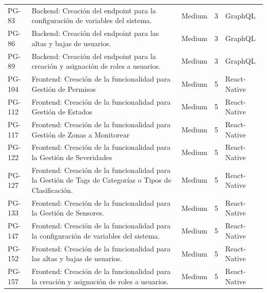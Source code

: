 \documentclass[11pt]{charter}
\begin{document}
\begin{tabularx}{\linewidth}{@{}p{1.3cm} p{14cm} p{1.7cm} p{1.5cm} p{2.5cm}@{}}
PG-83  & Backend: Creación del endpoint para la configuración de variables del sistema.                         & Medium    & 3                          & GraphQL               \\
PG-86  & Backend: Creación del endpoint para las altas y bajas de usuarios.                                     & Medium    & 3                          & GraphQL               \\
PG-89  & Backend: Creación del endpoint para la creación y asignación de roles a usuarios.                      & Medium    & 3                          & GraphQL               \\
PG-104 & Frontend: Creación de la funcionalidad para Gestión de Permisos                                        & Medium    & 5                          & React-Native          \\
PG-112 & Frontend: Creación de la funcionalidad para Gestión de Estados                                         & Medium    & 5                          & React-Native          \\
PG-117 & Frontend: Creación de la funcionalidad para Gestión de Zonas a Monitorear                              & Medium    & 5                          & React-Native          \\
PG-122 & Frontend: Creación de la funcionalidad para la Gestión de Severidades                                  & Medium    & 5                          & React-Native          \\
PG-127 & Frontend: Creación de la funcionalidad para la Gestión de Tags de Categorías o Tipos de Clasificación. & Medium    & 5                          & React-Native          \\
PG-133 & Frontend: Creación de la funcionalidad para la Gestión de Sensores.                                    & Medium    & 5                          & React-Native          \\
PG-147 & Frontend: Creación de la funcionalidad para la configuración de variables del sistema.                 & Medium    & 5                          & React-Native          \\
PG-152 & Frontend: Creación de la funcionalidad para las altas y bajas de usuarios.                             & Medium    & 5                          & React-Native          \\
PG-157 & Frontend: Creación de la funcionalidad para la creación y asignación de roles a usuarios.              & Medium    & 5                          & React-Native          \\

\end{tabularx}
\end{document}
